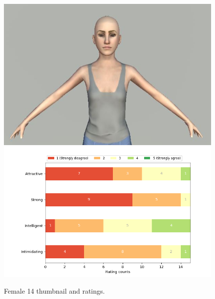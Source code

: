 \begin{figure}[H]
  \includegraphics[width=\linewidth]{Images/Females/14.JPG}
\endminipage\hfill
{}
  \includegraphics[width=\linewidth]{Survey/FRatings/avatar_f14.png}
\endminipage\hfill
\caption{Female 14 thumbnail and ratings.}
\end{figure}

